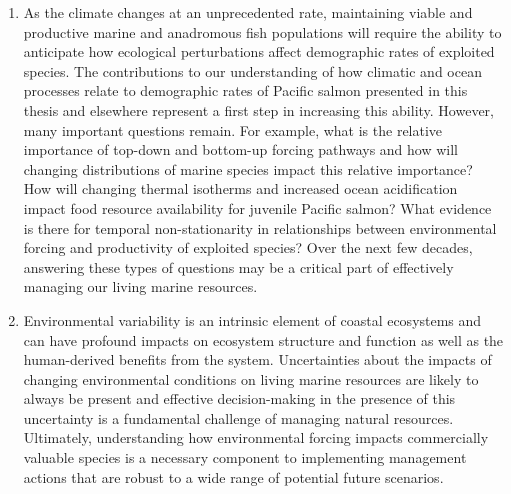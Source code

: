 \begin{enumerate}
\item
  As the climate changes at an unprecedented rate, maintaining viable
  and productive marine and anadromous fish populations will require the
  ability to anticipate how ecological perturbations affect demographic
  rates of exploited species. The contributions to our understanding of
  how climatic and ocean processes relate to demographic rates of
  Pacific salmon presented in this thesis and elsewhere represent a
  first step in increasing this ability. However, many important
  questions remain. For example, what is the relative importance of
  top-down and bottom-up forcing pathways and how will changing
  distributions of marine species impact this relative importance? How
  will changing thermal isotherms and increased ocean acidification
  impact food resource availability for juvenile Pacific salmon? What
  evidence is there for temporal non-stationarity in relationships
  between environmental forcing and productivity of exploited species?
  Over the next few decades, answering these types of questions may be a
  critical part of effectively managing our living marine resources.
\item
  Environmental variability is an intrinsic element of coastal
  ecosystems and can have profound impacts on ecosystem structure and
  function as well as the human-derived benefits from the system.
  Uncertainties about the impacts of changing environmental conditions
  on living marine resources are likely to always be present and
  effective decision-making in the presence of this uncertainty is a
  fundamental challenge of managing natural resources. Ultimately,
  understanding how environmental forcing impacts commercially valuable
  species is a necessary component to implementing management actions
  that are robust to a wide range of potential future scenarios.
\end{enumerate}
